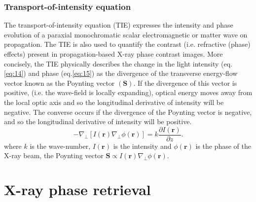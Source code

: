 \documentclass[10pt, a4paper, singlespacing]{report}
\begin{document}
\subsubsection{Transport-of-intensity equation}\label{TIE}

The transport-of-intensity equation (TIE) expresses the intensity and phase evolution of a paraxial monochromatic scalar electromagnetic or matter wave on propagation\cite{Pags2002}. The TIE is also used to quantify the contrast (i.e. refractive (phase) effects) present in propagation-based X-ray phase contrast images\cite{PagsTutes}.
More concisely, the TIE physically describes the change in the light intensity (eq.\ref{eq:14}) and phase (eq.\ref{eq:15}) as the divergence of the transverse energy-flow vector known as the Poynting vector $(\textbf{S})$. If the divergence of this vector is positive, (i.e. the wave-field is locally expanding), optical energy moves away from the local optic axis and so the longitudinal derivative of
intensity will be negative. The converse occurs if the divergence of the Poynting vector is negative, and so the longitudinal derivative of intensity will be positive\cite{PagsTutes}.
\begin{equation}\label{eq:16}
-\nabla_{\perp} [I(\mathbf{r}) \nabla_{\perp} \phi(\mathbf{r})] = k \frac{\partial I (\mathbf{r})}{\partial z}.
\end{equation}
where $k$ is the wave-number, $I(\mathbf{r})$ is the intensity and $\phi(\mathbf{r})$ is the phase of the X-ray beam, the Poynting vector $\textbf{S} \propto I(\mathbf{r}) \nabla_{\perp} \phi(\mathbf{r})$.

\section{X-ray phase retrieval}\label{PR}
\end{document}
